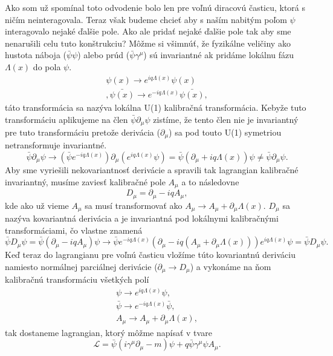\documentclass[../../main.tex]{subfiles}
\begin{document}
Ako som už spomínal toto odvodenie bolo len pre voľnú diracovú časticu, ktorá s ničím neinteragovala. Teraz však budeme chcieť aby s naším nabitým poľom $\psi$ interagovalo nejaké ďalšie pole. Ako ale pridať nejaké ďalšie pole tak aby sme nenarušili celu tuto konštrukciu? Môžme si všimnúť, že fyzikálne veličiny ako hustota náboja ($\bar{\psi}\psi$) alebo prúd ($\bar{\psi}\gamma^{\mu}$) sú invariantné ak pridáme lokálnu fázu $\Lambda(x)$ do pola $\psi$.
\begin{equation}
\begin{gathered}
\psi(x)\rightarrow e^{iq\Lambda(x)}\psi(x)\\,
\bar{\psi(x)}\rightarrow e^{-iq\Lambda(x)}\bar{\psi(x)},
\end{gathered}
\end{equation}
táto transformácia sa nazýva lokálna U(1) kalibračná transformácia. Kebyže tuto transformáciu aplikujeme na člen $\bar{\psi}\partial_{\mu}\psi$ zistíme, že tento člen nie je invariantný pre tuto transformáciu pretože derivácia ($\partial_{\mu}$) sa pod touto U(1) symetriou netransformuje invariantné.
\begin{equation}
\bar{\psi}\partial_{\mu}\psi \rightarrow (\bar{\psi}e^{-iq\Lambda(x)})\partial_{\mu}(e^{iq\Lambda(x)}\psi)=\bar{\psi}(\partial_{\mu}+iq\Lambda(x))\psi\neq \bar{\psi}\partial_{\mu}\psi.
\end{equation}
Aby sme vyriešili nekovariantnosť derivácie a spravili tak lagrangian kalibračné invariantný, musíme zaviesť kalibračné pole $A_{\mu}$ a to následovne
\begin{equation}
D_{\mu}=\partial_{\mu}-iqA_{\mu},
\end{equation}
kde ako už vieme $A_{\mu}$ sa musí transformovať ako $A_{\mu}\rightarrow A_{\mu}+\partial_{\mu} \Lambda(x)$. $D_{\mu}$ sa nazýva kovariantná derivácia a je invariantná pod lokálnymi kalibračnými transformáciami, čo vlastne znamená
\begin{equation}
\bar{\psi}D_{\mu}\psi=\bar{\psi}(\partial_{\mu}-iqA_{\mu})\psi \rightarrow \bar{\psi}e^{-iq\Lambda(x)}(\partial_{\mu} - iq(A_{\mu}+\partial_{\mu}\Lambda(x)))e^{iq\Lambda(x)}\psi=\bar{\psi}D_{\mu}\psi.
\end{equation}
Keď teraz do lagrangianu pre voľnú časticu vložíme túto kovariantnú deriváciu namiesto normálnej parciálnej derivácie ($\partial_{\mu}\rightarrow D_{\mu}$) a vykonáme na ňom kalibračnú transformáciu všetkých polí
\begin{equation}
\begin{gathered}
\psi \rightarrow e^{iq\Lambda(x)}\psi, \\
\bar{\psi} \rightarrow e^{-iq\Lambda(x)}\bar{\psi}, \\
A_{\mu}\rightarrow A_{\mu}+\partial_{\mu}\Lambda(x),
\end{gathered}
\end{equation}
tak dostaneme lagrangian, ktorý môžme napísať v tvare
\begin{equation}
\mathcal{L}=\bar{\psi}(i\gamma^{\mu}\partial_{\mu}-m)\psi+q\bar{\psi}\gamma^{\mu}\psi A_{\mu}.
\end{equation}
\end{document}
